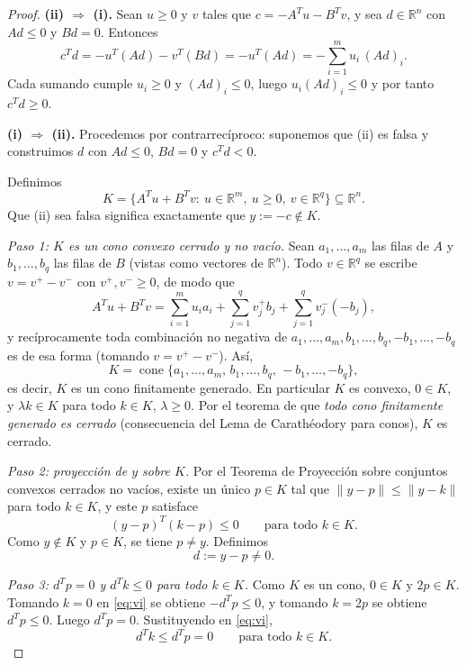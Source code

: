 \documentclass[11pt]{article}
\begin{document}
\begin{proof}
\textbf{(ii) $\Rightarrow$ (i).}
Sean $u\ge 0$ y $v$ tales que $c=-A^Tu-B^Tv$, y sea $d\in\mathbb{R}^n$ con $Ad\le 0$ y $Bd=0$. Entonces
\[
c^Td=-u^T(Ad)-v^T(Bd)=-u^T(Ad)=-\sum_{i=1}^m u_i\,(Ad)_i .
\]
Cada sumando cumple $u_i\ge 0$ y $(Ad)_i\le 0$, luego $u_i(Ad)_i\le 0$ y por tanto $c^Td\ge 0$.

\medskip
\textbf{(i) $\Rightarrow$ (ii).}
Procedemos por contrarrecíproco: suponemos que (ii) es falsa y construimos $d$ con $Ad\le 0$, $Bd=0$ y $c^Td<0$.

Definimos
\[
K=\{A^Tu+B^Tv:\ u\in\mathbb{R}^m,\ u\ge 0,\ v\in\mathbb{R}^q\}\subseteq\mathbb{R}^n .
\]
Que (ii) sea falsa significa exactamente que $y:=-c\notin K$.

\emph{Paso 1: $K$ es un cono convexo cerrado y no vacío.}
Sean $a_1,\dots,a_m$ las filas de $A$ y $b_1,\dots,b_q$ las filas de $B$ (vistas como vectores de $\mathbb{R}^n$). Todo $v\in\mathbb{R}^q$ se escribe $v=v^+-v^-$ con $v^+,v^-\ge 0$, de modo que
\[
A^Tu+B^Tv=\sum_{i=1}^m u_i a_i+\sum_{j=1}^q v^+_j b_j+\sum_{j=1}^q v^-_j(-b_j),
\]
y recíprocamente toda combinación no negativa de $a_1,\dots,a_m,b_1,\dots,b_q,-b_1,\dots,-b_q$ es de esa forma (tomando $v=v^+-v^-$). Así,
\[
K=\operatorname{cone}\{a_1,\dots,a_m,\,b_1,\dots,b_q,\,-b_1,\dots,-b_q\},
\]
es decir, $K$ es un cono finitamente generado. En particular $K$ es convexo, $0\in K$, y $\lambda k\in K$ para todo $k\in K$, $\lambda\ge 0$. Por el teorema de que \emph{todo cono finitamente generado es cerrado} (consecuencia del Lema de Carathéodory para conos), $K$ es cerrado.

\emph{Paso 2: proyección de $y$ sobre $K$.}
Por el Teorema de Proyección sobre conjuntos convexos cerrados no vacíos, existe un único $p\in K$ tal que $\|y-p\|\le\|y-k\|$ para todo $k\in K$, y este $p$ satisface
\begin{equation}\label{eq:vi}
(y-p)^T(k-p)\le 0\qquad\text{para todo }k\in K.
\end{equation}
Como $y\notin K$ y $p\in K$, se tiene $p\neq y$. Definimos
\[
d:=y-p\neq 0 .
\]

\emph{Paso 3: $d^Tp=0$ y $d^Tk\le 0$ para todo $k\in K$.}
Como $K$ es un cono, $0\in K$ y $2p\in K$. Tomando $k=0$ en \eqref{eq:vi} se obtiene $-d^Tp\le 0$, y tomando $k=2p$ se obtiene $d^Tp\le 0$. Luego $d^Tp=0$. Sustituyendo en \eqref{eq:vi},
\begin{equation}\label{eq:polar}
d^Tk\le d^Tp=0\qquad\text{para todo }k\in K.
\end{equation}


\end{proof}
\end{document}
